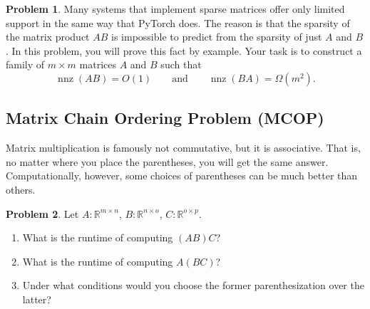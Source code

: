 \documentclass[10pt]{article}
\theoremstyle{definition}
\newtheorem{problem}{Problem}
\newtheorem{note}{Note}
\newcommand{\R}{\mathbb R}
\DeclareMathOperator{\nnz}{nnz}
\newcommand{\trans}[1]{{#1}^{T}}
\begin{document}
\newpage
\begin{problem}
    Many systems that implement sparse matrices offer only limited support in the same way that PyTorch does.
    The reason is that the sparsity of the matrix product $AB$ is impossible to predict from the sparsity of just $A$ and $B$.
    In this problem, you will prove this fact by example.
    Your task is to construct a family of $m\times m$ matrices $A$ and $B$ such that
    \begin{equation}
        \nnz(AB) = O(1)
        \qquad
        \text{and}
        \qquad
        \nnz(BA) = \Omega(m^2)
        .
    \end{equation}
    \vspace{3in}
\end{problem}




\newpage
\subsection{Matrix Chain Ordering Problem (MCOP)}

Matrix multiplication is famously not commutative, but it is associative.
That is, no matter where you place the parentheses,
you will get the same answer.
Computationally, however, some choices of parentheses can be much better than others.

\begin{problem}
    Let $A : \R^{m\times n}$, $B : \R^{n\times o}$, $C : \R^{o\times p}$.

    \begin{enumerate}
        \item What is the runtime of computing $(AB)C$?
            \vspace{2in}
        \item What is the runtime of computing $A(BC)$?
            \vspace{2in}
        \item Under what conditions would you choose the former parenthesization over the latter?
            \vspace{2in}
    \end{enumerate}
\end{problem}
\end{document}
